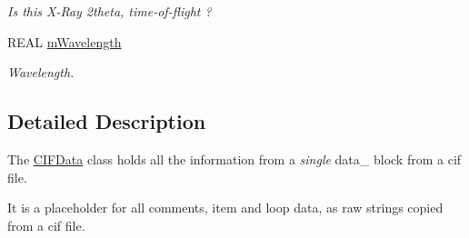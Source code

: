 \begin{DoxyCompactItemize}
\begin{DoxyCompactList}\small\item\em Is this X-\/\+Ray 2theta, time-\/of-\/flight ? \end{DoxyCompactList}\item 
\mbox{\label{class_obj_cryst_1_1_c_i_f_data_a1e3b807b7f6ceb513ef8b602b2135cdd}} 
R\+E\+AL \mbox{\hyperlink{class_obj_cryst_1_1_c_i_f_data_a1e3b807b7f6ceb513ef8b602b2135cdd}{m\+Wavelength}}
\begin{DoxyCompactList}\small\item\em Wavelength. \end{DoxyCompactList}\end{DoxyCompactItemize}


\subsection{Detailed Description}
The \mbox{\hyperlink{class_obj_cryst_1_1_c_i_f_data}{C\+I\+F\+Data}} class holds all the information from a {\itshape single} data\+\_\+ block from a cif file.

It is a placeholder for all comments, item and loop data, as raw strings copied from a cif file.

